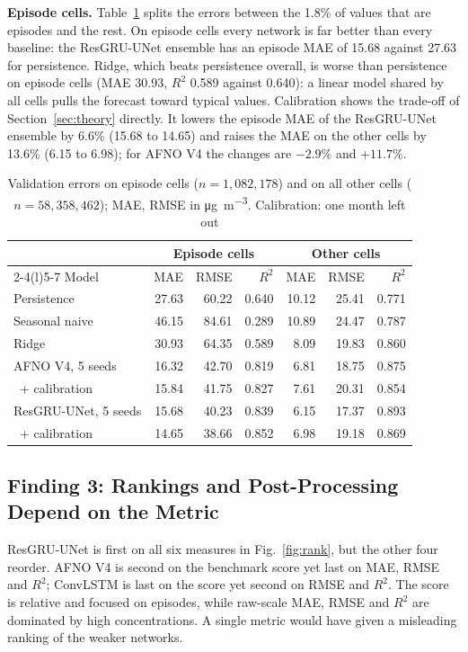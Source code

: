 \documentclass[journal]{IEEEtran}
\newcommand{\ugm}{\si{\micro\gram\per\cubic\metre}}
\begin{document}
\textbf{Episode cells.} Table~\ref{tab:episode} splits the errors between the 1.8\% of values that are episodes and the rest. On episode cells every network is far better than every baseline: the ResGRU-UNet ensemble has an episode MAE of 15.68 against 27.63 for persistence. Ridge, which beats persistence overall, is worse than persistence on episode cells (MAE 30.93, $R^2$ 0.589 against 0.640): a linear model shared by all cells pulls the forecast toward typical values. Calibration shows the trade-off of Section~\ref{sec:theory} directly. It lowers the episode MAE of the ResGRU-UNet ensemble by 6.6\% (15.68 to 14.65) and raises the MAE on the other cells by 13.6\% (6.15 to 6.98); for AFNO V4 the changes are $-2.9$\% and $+11.7$\%.

\begin{table}[!htb]
\centering
\caption{Validation errors on episode cells ($n=1{,}082{,}178$) and on all other cells ($n=58{,}358{,}462$); MAE, RMSE in \ugm. Calibration: one month left out}
\label{tab:episode}
\setlength{\tabcolsep}{2.4pt}
\begin{tabular}{@{}lrrrrrr@{}}
\toprule
 & \multicolumn{3}{c}{Episode cells} & \multicolumn{3}{c}{Other cells} \\
\cmidrule(lr){2-4}\cmidrule(l){5-7}
Model & MAE & RMSE & $R^2$ & MAE & RMSE & $R^2$ \\
\midrule
Persistence & 27.63 & 60.22 & 0.640 & 10.12 & 25.41 & 0.771 \\
Seasonal naive & 46.15 & 84.61 & 0.289 & 10.89 & 24.47 & 0.787 \\
Ridge & 30.93 & 64.35 & 0.589 & 8.09 & 19.83 & 0.860 \\
AFNO V4, 5 seeds & 16.32 & 42.70 & 0.819 & 6.81 & 18.75 & 0.875 \\
\ + calibration & 15.84 & 41.75 & 0.827 & 7.61 & 20.31 & 0.854 \\
ResGRU-UNet, 5 seeds & 15.68 & 40.23 & 0.839 & 6.15 & 17.37 & 0.893 \\
\ + calibration & 14.65 & 38.66 & 0.852 & 6.98 & 19.18 & 0.869 \\
\bottomrule
\end{tabular}
\end{table}

\subsection{Finding 3: Rankings and Post-Processing Depend on the Metric}
\label{sec:finding3}
ResGRU-UNet is first on all six measures in Fig.~\ref{fig:rank}, but the other four reorder. AFNO V4 is second on the benchmark score yet last on MAE, RMSE and $R^2$; ConvLSTM is last on the score yet second on RMSE and $R^2$. The score is relative and focused on episodes, while raw-scale MAE, RMSE and $R^2$ are dominated by high concentrations. A single metric would have given a misleading ranking of the weaker networks.
\end{document}
